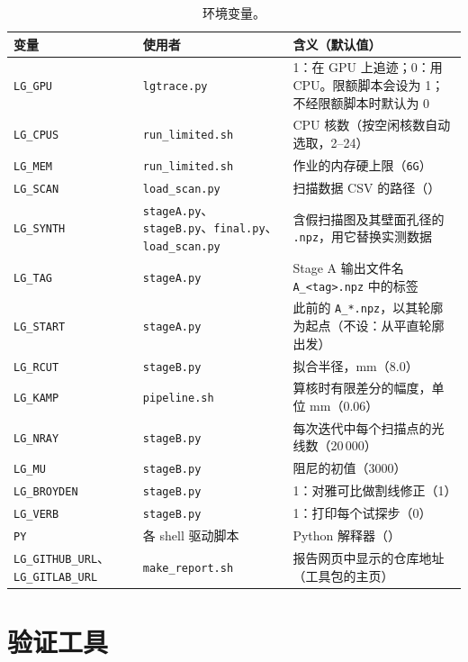 \documentclass[11pt,a4paper,fontset=fandol]{ctexart}
\newcommand{\code}[1]{\texttt{#1}}
\begin{document}
\begin{table}[H]
\caption{环境变量。}\label{tab:env}
\begin{tabularx}{\textwidth}{@{}L{2.6cm}L{3.4cm}Y@{}}
\toprule
变量 & 使用者 & 含义（默认值） \\
\midrule
\code{LG\_GPU} & \code{lgtrace.py} & 1：在 GPU 上追迹；0：用 CPU。限额脚本会设为 1；不经限额脚本时默认为 0 \\
\code{LG\_CPUS} & \code{run\_limited.sh} & CPU 核数（按空闲核数自动选取，2--24） \\
\code{LG\_MEM} & \code{run\_limited.sh} & 作业的内存硬上限（\code{6G}） \\
\code{LG\_SCAN} & \code{load\_scan.py} & 扫描数据 CSV 的路径（） \\
\code{LG\_SYNTH} & \code{stageA.py}、\code{stageB.py}、\code{final.py}、\code{load\_scan.py} & 含假扫描图及其壁面孔径的 \code{.npz}，用它替换实测数据 \\
\code{LG\_TAG} & \code{stageA.py} & Stage A 输出文件名 \code{A\_<tag>.npz} 中的标签 \\
\code{LG\_START} & \code{stageA.py} & 此前的 \code{A\_*.npz}，以其轮廓为起点（不设：从平直轮廓出发） \\
\code{LG\_RCUT} & \code{stageB.py} & 拟合半径，mm（8.0） \\
\code{LG\_KAMP} & \code{pipeline.sh} & 算核时有限差分的幅度，单位 mm（0.06） \\
\code{LG\_NRAY} & \code{stageB.py} & 每次迭代中每个扫描点的光线数（20\,000） \\
\code{LG\_MU} & \code{stageB.py} & 阻尼的初值（3000） \\
\code{LG\_BROYDEN} & \code{stageB.py} & 1：对雅可比做割线修正（1） \\
\code{LG\_VERB} & \code{stageB.py} & 1：打印每个试探步（0） \\
\code{PY} & 各 shell 驱动脚本 & Python 解释器（） \\
{\small\code{LG\_GITHUB\_URL}、\code{LG\_GITLAB\_URL}} & \code{make\_report.sh} & 报告网页中显示的仓库地址（工具包的主页） \\
\bottomrule
\end{tabularx}
\end{table}

\section{验证工具}
\label{sec:validation}
\end{document}
